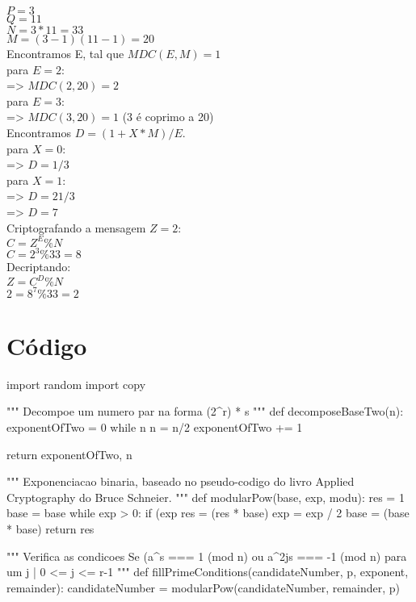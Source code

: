 \documentclass[a4paper,11pt]{article}
\theoremstyle{mytheor}
\begin{document}
$P = 3$\\
$Q = 11$\\
$N = 3 * 11 = 33$\\
$M = (3 - 1)(11 - 1) = 20$\\

Encontramos E, tal que $MDC(E, M) = 1$\\
para $E = 2$:\\
    => $MDC(2, 20) = 2$\\
para $E = 3$:\\
    => $MDC(3, 20) = 1$ (3 é coprimo a 20)\\

Encontramos $D = (1 + X*M) / E$.\\
para $X = 0$:\\
    => $D = 1 / 3$\\
para $X = 1$:\\
    => $D = 21 / 3$\\
    => $D = 7$\\

Criptografando a mensagem $Z = 2$:\\
$C = Z^E \% N$\\
$C = 2^3 \% 33 = 8$\\

Decriptando:\\
$Z = C^D \% N$\\
$2 = 8^7 \% 33 = 2$

\section*{Código}
import random
import copy

"""
Decompoe um numero par na forma (2^r) * s
"""
def decomposeBaseTwo(n):
    exponentOfTwo = 0
    while n %
      n = n/2
      exponentOfTwo += 1
 
    return exponentOfTwo, n

"""
Exponenciacao binaria, baseado no pseudo-codigo do livro Applied Cryptography do Bruce Schneier.
"""
def modularPow(base, exp, modu):
    res = 1
    base = base %
    while exp > 0:
        if (exp %
            res = (res * base) %
        exp = exp / 2
        base = (base * base) %
    return res

"""
Verifica as condicoes
    Se (a^s === 1 (mod n) ou a^2js === -1 (mod n) 
    para um j | 0 <= j <= r-1
"""
def fillPrimeConditions(candidateNumber, p, exponent, remainder):
   candidateNumber = modularPow(candidateNumber, remainder, p)
 
\end{document}
